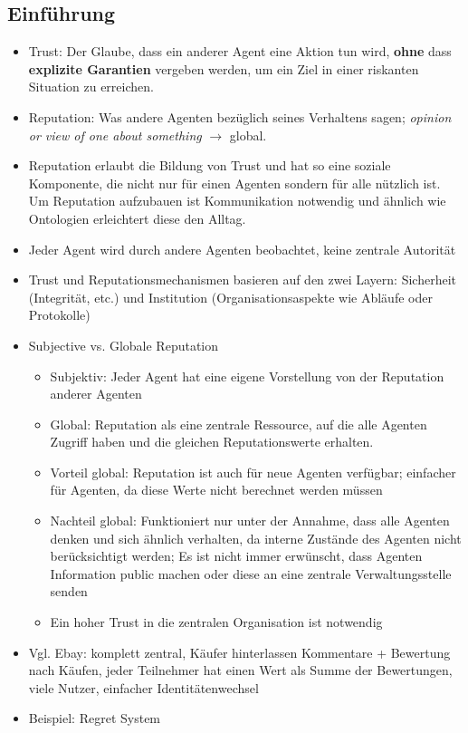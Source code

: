 \documentclass{article} %
\begin{document}
	\subsection{Einführung}
	\begin{itemize}
		\item Trust: Der Glaube, dass ein anderer Agent eine Aktion tun wird, \textbf{ohne} dass \textbf{explizite Garantien} vergeben werden, um ein Ziel in einer riskanten Situation zu erreichen.
		\item Reputation: Was andere Agenten bezüglich seines Verhaltens sagen; \emph{opinion  or  view  of  one about  something} $\rightarrow$ global.
		\item Reputation erlaubt die Bildung von Trust und hat so eine soziale Komponente, die nicht nur für einen Agenten sondern für alle nützlich ist. Um Reputation aufzubauen ist Kommunikation notwendig und ähnlich wie Ontologien erleichtert diese den Alltag.
		\item Jeder Agent wird durch andere Agenten beobachtet, keine zentrale Autorität
		\item Trust und Reputationsmechanismen basieren auf den zwei Layern: Sicherheit (Integrität, etc.) und Institution (Organisationsaspekte wie Abläufe oder Protokolle)
		\item Subjective vs. Globale Reputation
		\begin{itemize}
			\item Subjektiv: Jeder Agent hat eine eigene Vorstellung von der Reputation anderer Agenten
			\item Global: Reputation als eine zentrale Ressource, auf die alle Agenten Zugriff haben und die gleichen Reputationswerte erhalten.
			\item Vorteil global: Reputation ist auch für neue Agenten verfügbar; einfacher für Agenten, da diese Werte nicht berechnet werden müssen
			\item Nachteil global: Funktioniert nur unter der Annahme, dass alle Agenten denken und sich ähnlich verhalten, da interne Zustände des Agenten nicht berücksichtigt werden; Es ist nicht immer erwünscht, dass Agenten Information public machen oder diese an eine zentrale Verwaltungsstelle senden
			\item Ein hoher Trust in die zentralen Organisation ist notwendig
		\end{itemize}
		\item Vgl. Ebay: komplett zentral, Käufer hinterlassen Kommentare + Bewertung nach Käufen, jeder Teilnehmer hat einen Wert als Summe der Bewertungen, viele Nutzer, einfacher Identitätenwechsel
		\item Beispiel: Regret System
	\end{itemize}
\end{document}
